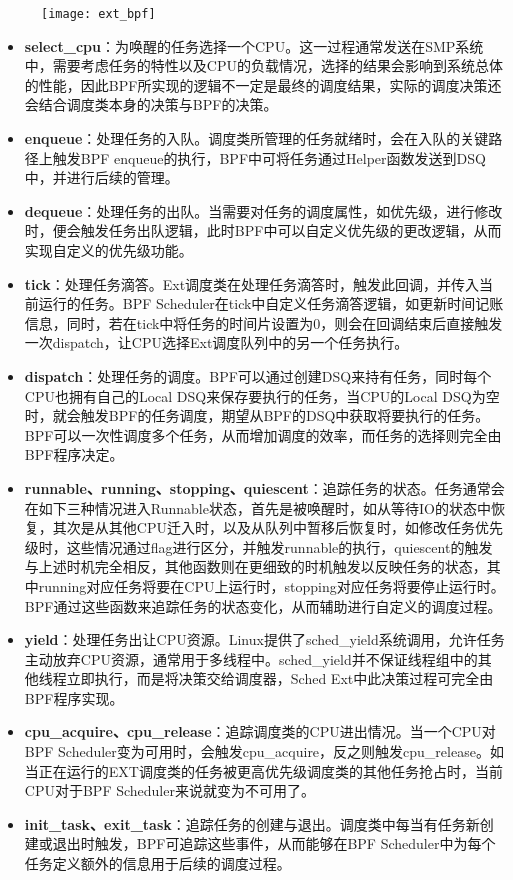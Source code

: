 \begin{figure}[!htbp]
    \centering
    \texttt{[image: ext\_bpf]}
    \label{fig:ext_bpf}
\end{figure}

\begin{itemize}
    \item \textbf{select\_cpu}：为唤醒的任务选择一个CPU。这一过程通常发送在SMP系统中，需要考虑任务的特性以及CPU的负载情况，选择的结果会影响到系统总体的性能，因此BPF所实现的逻辑不一定是最终的调度结果，实际的调度决策还会结合调度类本身的决策与BPF的决策。
    \item \textbf{enqueue}：处理任务的入队。调度类所管理的任务就绪时，会在入队的关键路径上触发BPF enqueue的执行，BPF中可将任务通过Helper函数发送到DSQ中，并进行后续的管理。
    \item \textbf{dequeue}：处理任务的出队。当需要对任务的调度属性，如优先级，进行修改时，便会触发任务出队逻辑，此时BPF中可以自定义优先级的更改逻辑，从而实现自定义的优先级功能。
    \item \textbf{tick}：处理任务滴答。Ext调度类在处理任务滴答时，触发此回调，并传入当前运行的任务。BPF Scheduler在tick中自定义任务滴答逻辑，如更新时间记账信息，同时，若在tick中将任务的时间片设置为0，则会在回调结束后直接触发一次dispatch，让CPU选择Ext调度队列中的另一个任务执行。
    \item \textbf{dispatch}：处理任务的调度。BPF可以通过创建DSQ来持有任务，同时每个CPU也拥有自己的Local DSQ来保存要执行的任务，当CPU的Local DSQ为空时，就会触发BPF的任务调度，期望从BPF的DSQ中获取将要执行的任务。BPF可以一次性调度多个任务，从而增加调度的效率，而任务的选择则完全由BPF程序决定。
    \item \textbf{runnable、running、stopping、quiescent}：追踪任务的状态。任务通常会在如下三种情况进入Runnable状态，首先是被唤醒时，如从等待IO的状态中恢复，其次是从其他CPU迁入时，以及从队列中暂移后恢复时，如修改任务优先级时，这些情况通过flag进行区分，并触发runnable的执行，quiescent的触发与上述时机完全相反，其他函数则在更细致的时机触发以反映任务的状态，其中running对应任务将要在CPU上运行时，stopping对应任务将要停止运行时。BPF通过这些函数来追踪任务的状态变化，从而辅助进行自定义的调度过程。
    \item \textbf{yield}：处理任务出让CPU资源。Linux提供了sched\_yield系统调用，允许任务主动放弃CPU资源，通常用于多线程中。sched\_yield并不保证线程组中的其他线程立即执行，而是将决策交给调度器，Sched Ext中此决策过程可完全由BPF程序实现。
    \item \textbf{cpu\_acquire、cpu\_release}：追踪调度类的CPU进出情况。当一个CPU对BPF Scheduler变为可用时，会触发cpu\_acquire，反之则触发cpu\_release。如当正在运行的EXT调度类的任务被更高优先级调度类的其他任务抢占时，当前CPU对于BPF Scheduler来说就变为不可用了。
    \item \textbf{init\_task、exit\_task}：追踪任务的创建与退出。调度类中每当有任务新创建或退出时触发，BPF可追踪这些事件，从而能够在BPF Scheduler中为每个任务定义额外的信息用于后续的调度过程。
\end{itemize}

